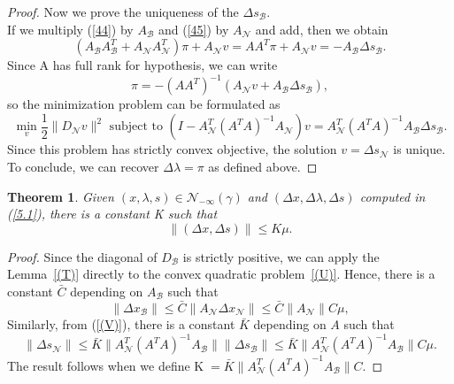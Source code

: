\documentclass[a4paper,10 pt,titlepage,twoside]{book}
\theoremstyle{plain}
\newtheorem{thm}{Theorem}[chapter]
\theoremstyle{definition}
\theoremstyle{remark}
\begin{document}
\begin{proof}
	Now we prove the uniqueness of the $\Delta s_{\mathcal{B}}$.\\
	If we multiply (\ref{44}) by $A_{\mathcal{B}}$ and (\ref{45}) by $A_{\mathcal{N}}$ and add, then we obtain
	\begin{equation*}
	(A_{\mathcal{B}}A_{\mathcal{B}}^{T}+A_{\mathcal{N}}A_{\mathcal{N}}^{T})\pi+A_{\mathcal{N}}v = AA^{T}\pi+A_{\mathcal{N}}v = -A_{\mathcal{B}}\Delta s_{\mathcal{B}}.
	\end{equation*} 
	Since A has full rank for hypothesis, we can write
	\begin{equation*}
	\pi = -(AA^{T})^{-1}(A_{\mathcal{N}}v +A_{\mathcal{B}}\Delta s_{\mathcal{B}}),
	\end{equation*}
	so the minimization problem can be formulated as
	\begin{equation}\label{(V)}
	\min\limits_{v}\frac{1}{2}\lVert D_{\mathcal{N}}v\rVert^{2} \text{ subject to }
	(I-A_{\mathcal{N}}^{T}(A^{T}A)^{-1}A_{\mathcal{N}})v =A_{\mathcal{N}}^{T}(A^{T}A)^{-1}A_{\mathcal{B}}\Delta s_{\mathcal{B}}.		 
	\end{equation}
	Since this problem  has strictly convex objective, the solution $v=\Delta s_{\mathcal{N}}$ is unique. To conclude, we can recover $\Delta \lambda=\pi$ as defined above. 
\end{proof}
\begin{thm}\label{(Z)}
	Given $(x, \lambda, s)\in\mathcal{N}_{- \infty}(\gamma)$ and $(\Delta x,\Delta \lambda, \Delta s)$ computed in (\ref{5.1}), there is a constant K such that
	\begin{equation*}
	\lVert (\Delta x, \Delta s)\rVert \leq K \mu.
	\end{equation*}
\end{thm}
\begin{proof}
	Since the diagonal of $D_{\mathcal{B}}$ is strictly positive, we can apply the Lemma~\ref{(T)} directly to the convex quadratic problem~\ref{(U)}. Hence, there is a constant $\bar{C}$ depending on $A_{\mathcal{B}}$ such that
	\begin{equation}
	\lVert \Delta x_{\mathcal{B}}\rVert \leq \bar{C}\lVert A_{\mathcal{N}}\Delta x_{\mathcal{N}}\rVert\leq \bar{C}\lVert A_{\mathcal{N}}\rVert C\mu,
	\end{equation}
	Similarly, from (\ref{(V)}), there is a constant $\bar{K}$ depending on $A$ such that
	\begin{equation}
	\lVert \Delta s_{\mathcal{N}}\rVert \leq \bar{K}\lVert A_{\mathcal{N}}^{T}(A^{T}A)^{-1}A_{\mathcal{B}}\rVert\lVert \Delta s_{\mathcal{B}}\rVert \leq\bar{K} \lVert A_{\mathcal{N}}^{T}(A^{T}A)^{-1}A_{\mathcal{B}}\rVert C\mu.
	\end{equation}
	The result follows when we define K$\;=\bar{K} \lVert A_{\mathcal{N}}^{T}(A^{T}A)^{-1}A_{\mathcal{B}}\rVert C$.
\end{proof}
\end{document}
